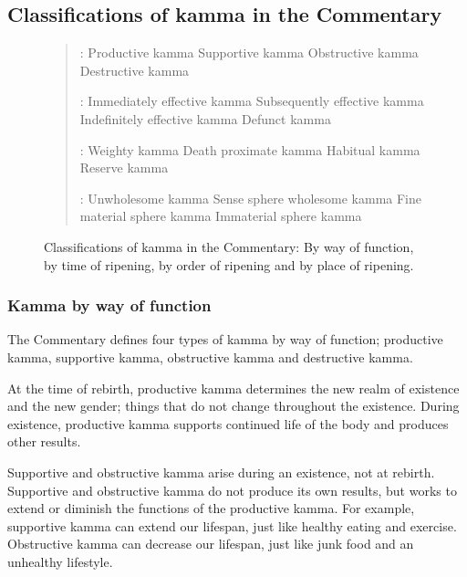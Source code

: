 \pagebreak

\subsection*{Classifications of kamma in the Commentary}

\begin{figure}[H]
\begin{quote}
:  Productive kamma  Supportive kamma  Obstructive kamma  Destructive kamma

:  Immediately effective kamma  Subsequently effective kamma  Indefinitely effective kamma  Defunct kamma

:  Weighty kamma  Death proximate kamma  Habitual kamma  Reserve kamma

:  Unwholesome kamma  Sense sphere wholesome kamma  Fine material sphere kamma  Immaterial sphere kamma

\end{quote}

\caption{Classifications of kamma in the Commentary: By way of function, by time of ripening, by order of ripening and by place of ripening.}
\label{fig:Classifications}
\end{figure}

\subsubsection*{Kamma by way of function}

The Commentary defines four types of kamma by way of function; productive kamma, supportive kamma, obstructive kamma and destructive kamma.

At the time of rebirth, productive kamma determines the new realm of existence and the new gender; things that do not change throughout the existence. During existence, productive kamma supports continued life of the body and produces other results.

Supportive and obstructive kamma arise during an existence, not at rebirth. Supportive and obstructive kamma do not produce its own results, but works to extend or diminish the functions of the productive kamma. For example, supportive kamma can extend our lifespan, just like healthy eating and exercise. Obstructive kamma can decrease our lifespan, just like junk food and an unhealthy lifestyle.

